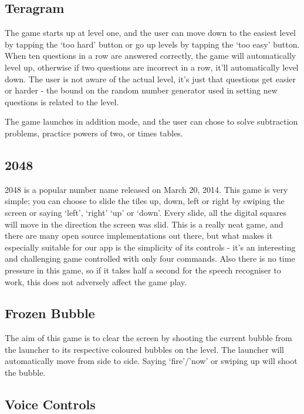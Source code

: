 \documentclass[11pt, oneside]{article}
\begin{document}
\subsection{Teragram}

The game starts up at level one, and the user can move down to the
easiest level by tapping the `too hard' button or go up levels by
tapping the `too easy' button. When ten questions in a row are
answered correctly, the game will automatically level up, otherwise if
two questions are incorrect in a row, it'll automatically level down.
The user is not aware of the actual level, it's just that questions
get easier or harder - the bound on the random number generator used
in setting new questions is related to the level.

The game launches in addition mode, and the user can chose to solve
subtraction problems, practice powers of two, or times tables.

\subsection{2048}

2048 is a popular number name released on March 20, 2014. This game is
very simple; you can choose to slide the tiles up, down, left or right
by swiping the screen or saying `left', `right' `up' or `down'. Every
slide, all the digital squares will move in the direction the screen was slid. 
This is a really neat game, and there are many open source
implementations out there, but what makes it especially suitable for
our app is the simplicity of its controls - it's an interesting and
challenging game controlled with only four commands. Also there is no
time pressure in this game, so if it takes half a second for the
speech recogniser to work, this does not adversely affect the game
play.

\subsection{Frozen Bubble}
The aim of this game is to clear the screen by shooting the current
bubble from the launcher to its respective coloured bubbles on the
level. The launcher will automatically move from side to side. Saying `fire'/'now' or swiping up will shoot the bubble.

\subsection{Voice Controls}
\end{document}
